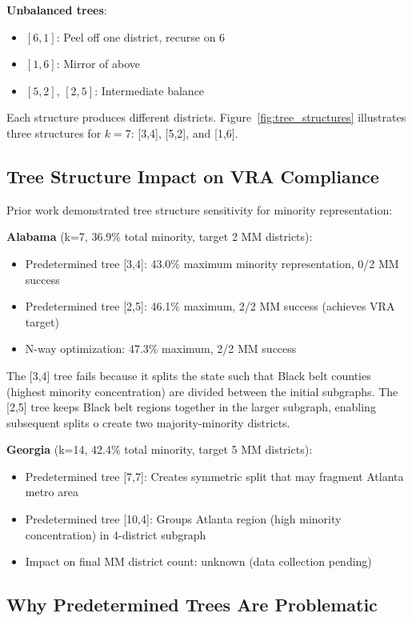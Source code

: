 \textbf{Unbalanced trees}:
\begin{itemize}
\item $[6,1]$: Peel off one district, recurse on 6
\item $[1,6]$: Mirror of above
\item $[5,2]$, $[2,5]$: Intermediate balance
\end{itemize}

Each structure produces different districts. Figure~\ref{fig:tree_structures} illustrates three structures for $k=7$: [3,4], [5,2], and [1,6].

\subsection{Tree Structure Impact on VRA Compliance}

Prior work \citep{dellaLibera2026nwayRecursive} demonstrated tree structure sensitivity for minority representation:

\textbf{Alabama} (k=7, 36.9\% total minority, target 2 MM districts):
\begin{itemize}
\item Predetermined tree [3,4]: 43.0\% maximum minority representation, 0/2 MM success
\item Predetermined tree [2,5]: 46.1\% maximum, 2/2 MM success (achieves VRA target)
\item N-way optimization: 47.3\% maximum, 2/2 MM success
\end{itemize}

The [3,4] tree fails because it splits the state such that Black belt counties (highest minority concentration) are divided between the initial subgraphs. The [2,5] tree keeps Black belt regions together in the larger subgraph, enabling subsequent splits 	o create two majority-minority districts.

\textbf{Georgia} (k=14, 42.4\% total minority, target 5 MM districts):
\begin{itemize}
\item Predetermined tree [7,7]: Creates symmetric split that may fragment Atlanta metro area
\item Predetermined tree [10,4]: Groups Atlanta region (high minority concentration) in 4-district subgraph
\item Impact on final MM district count: unknown (data collection pending)
\end{itemize}

\subsection{Why Predetermined Trees Are Problematic}

